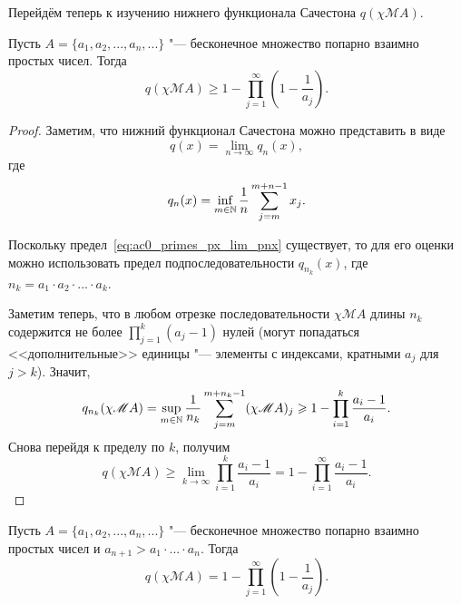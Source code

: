 Перейдём теперь к изучению нижнего функционала Сачестона $q(\chi\mathscr{M}A)$.

\begin{theorem}
	\label{thm:ac0_primes_p_psi_A_prod}
	Пусть $A = \{a_1, a_2, ..., a_n,...\}$ "--- бесконечное множество попарно взаимно простых чисел.
	Тогда
	\begin{equation}
		q(\chi\mathscr{M}A) \geq 1-\prod_{j=1}^\infty \left(1-\frac{1}{a_j}\right)
		.
	\end{equation}
\end{theorem}

\begin{proof}

	Заметим, что нижний функционал Сачестона можно представить в виде
	\begin{equation}
		\label{eq:ac0_primes_px_lim_pnx}
		q(x) = \lim_{n\to\infty} q_n(x)
		,
	\end{equation}
	где
	\begin{equation}
		q_n(x) = \inf_{m\in\mathbb{N}}  \frac{1}{n} \sum_{j=m}^{m+n-1} x_j
		.
	\end{equation}

	Поскольку предел~\eqref{eq:ac0_primes_px_lim_pnx} существует, то для его оценки можно использовать предел подпоследовательности
	$q_{n_k}(x)$, где $n_k = a_1\cdot a_2 \cdot ... \cdot a_k$.

	Заметим теперь, что в любом отрезке последовательности $\chi\mathscr{M}A$ длины $n_k$
	содержится не более $\prod_{j=1}^k (a_j-1)$ нулей
	(могут попадаться <<дополнительные>> единицы "--- элементы с индексами, кратными $a_j$ для $j>k$).
	Значит,
	\begin{equation}
		q_{n_k}(\chi\mathscr{M}A) =
		\sup_{m\in\mathbb{N}}  \frac{1}{n_k} \sum_{j=m}^{m+n_k-1} (\chi\mathscr{M}A)_j
		\geqslant
		1-\prod_{i=1}^k \frac{a_i-1}{a_i}
		.
	\end{equation}
	Снова перейдя к пределу по $k$, получим
	\begin{equation}
		\label{eq:ac0_primes_p_psi_A_upper_bound}
		q(\chi\mathscr{M}A) \geq \lim_{k\to \infty} \prod_{i=1}^k \frac{a_i-1}{a_i}
		=
		1-\prod_{i=1}^\infty \frac{a_i-1}{a_i}
		.
	\end{equation}

\end{proof}




\begin{corollary}
	\label{cor:ac0_primes_p_psi_A_prod}
	Пусть $A = \{a_1, a_2, ..., a_n,...\}$ "--- бесконечное множество попарно взаимно простых чисел
	и $a_{n+1}>a_1\cdot...\cdot a_n$.
	Тогда
	\begin{equation}
		q(\chi\mathscr{M}A) = 1-\prod_{j=1}^\infty \left(1-\frac{1}{a_j}\right)
		.
	\end{equation}
\end{corollary}

